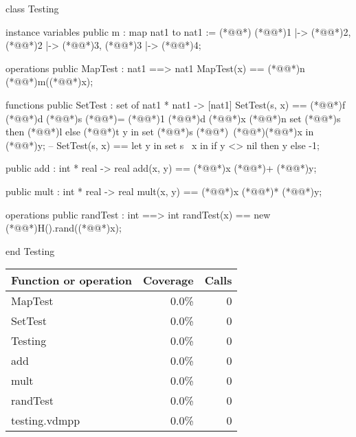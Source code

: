 \documentclass[a4paper]{article}
\begin{document}
\title{}
\author{}
\begin{vdm_al}
class Testing

instance variables
    public m : map nat1 to nat1 := (*@\vdmnotcovered{}@*){ (*@\vdmnotcovered{}@*)1 |-> (*@\vdmnotcovered{}@*)2, (*@\vdmnotcovered{}@*)2 |-> (*@\vdmnotcovered{}@*)3, (*@\vdmnotcovered{}@*)3 |-> (*@\vdmnotcovered{}@*)4};

operations
    public MapTest : nat1 ==> nat1
    MapTest(x) == (*@@*)n (*@\vdmnotcovered{}@*)m((*@\vdmnotcovered{}@*)x);

functions
    public SetTest : set of nat1 * nat1 -> [nat1]
    SetTest(s, x) == (*@@*)f (*@@*)d (*@\vdmnotcovered{}@*)s (*@\vdmnotcovered{}@*)= (*@\vdmnotcovered{}@*)1 (*@@*)d (*@\vdmnotcovered{}@*)x (*@@*)n set (*@\vdmnotcovered{}@*)s then (*@@*)l else (*@@*)t y in set (*@\vdmnotcovered{}@*)s (*@\vdmnotcovered{}@*)\ (*@\vdmnotcovered{}@*){(*@\vdmnotcovered{}@*)x} in (*@\vdmnotcovered{}@*)y;
    -- SetTest(s, x) == let y in set s \ {x} in if y <> nil then y else -1;

    public add : int * real -> real
    add(x, y) == (*@\vdmnotcovered{}@*)x (*@\vdmnotcovered{}@*)+ (*@\vdmnotcovered{}@*)y;

    public mult : int * real -> real
    mult(x, y) == (*@\vdmnotcovered{}@*)x (*@\vdmnotcovered{}@*)* (*@\vdmnotcovered{}@*)y;

operations
    public randTest : int ==> int
    randTest(x) == new (*@@*)H().rand((*@\vdmnotcovered{}@*)x);

end Testing 
\end{vdm_al}
\bigskip
\begin{longtable}{|l|r|r|}
\hline
Function or operation & Coverage & Calls \\
\hline
\hline
MapTest & 0.0\% & 0 \\
\hline
SetTest & 0.0\% & 0 \\
\hline
Testing & 0.0\% & 0 \\
\hline
add & 0.0\% & 0 \\
\hline
mult & 0.0\% & 0 \\
\hline
randTest & 0.0\% & 0 \\
\hline
\hline
testing.vdmpp & 0.0\% & 0 \\
\hline
\end{longtable}
\end{document}
